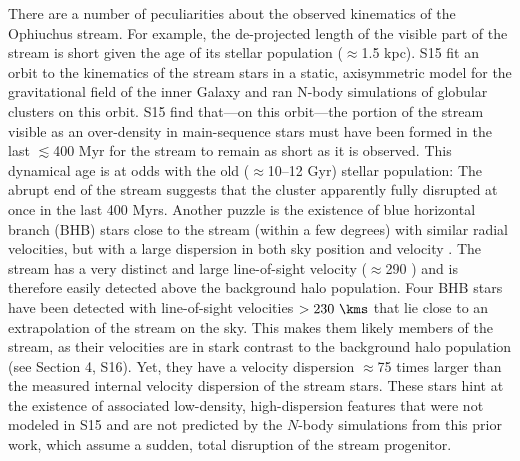 There are a number of peculiarities about the observed kinematics of the
Ophiuchus stream. For example, the de-projected length of the visible part of
the stream is short given the age of its stellar population ($\approx$1.5 kpc).
S15 fit an orbit to the kinematics of the stream stars in a static, axisymmetric
model for the gravitational field of the inner Galaxy and ran N-body simulations
of globular clusters on this orbit. S15 find that---on this orbit---the portion
of the stream visible as an over-density in main-sequence stars must have been
formed in the last $\lesssim$400 Myr for the stream to remain as short as it is
observed. This dynamical age is at odds with the old ($\approx$10--12 Gyr)
stellar population: The abrupt end of the stream suggests that the cluster
apparently fully disrupted at once in the last 400 Myrs. Another puzzle is the
existence of blue horizontal branch (BHB) stars close to the stream (within a
few degrees) with similar radial velocities, but with a large dispersion in both
sky position and velocity \citep[][hereafter S16]{sesar16}. The stream has a
very distinct and large line-of-sight velocity ($\approx$290 \kms) and is
therefore easily detected above the background halo population. Four BHB stars
have been detected with line-of-sight velocities $>230~\kms$ that lie close to
an extrapolation of the stream on the sky. This makes them likely members of the
stream, as their velocities are in stark contrast to the background halo
population (see Section 4, S16). Yet, they have a velocity dispersion
$\approx$75 times larger than the measured internal velocity dispersion of the
stream stars. These stars hint at the existence of associated low-density,
high-dispersion features that were not modeled in S15 and are not predicted by
the $N$-body simulations from this prior work, which assume a sudden, total
disruption of the stream progenitor.

